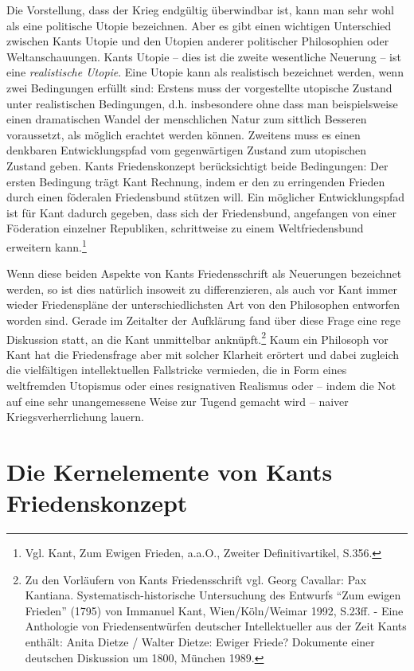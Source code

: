 \documentclass[12pt,a4paper,ngerman]{article}
\begin{document}
Die Vorstellung, dass der Krieg endgültig überwindbar ist, kann man
sehr wohl als eine politische Utopie bezeichnen. Aber es gibt einen
wichtigen Unterschied zwischen Kants Utopie und den Utopien anderer
politischer Philosophien oder Weltanschauungen. Kants Utopie -- dies
ist die zweite wesentliche Neuerung -- ist eine {\em realistische
  Utopie}. Eine Utopie kann als realistisch bezeichnet werden, wenn
zwei Bedingungen erfüllt sind: Erstens muss der vorgestellte utopische
Zustand unter realistischen Bedingungen, d.h. insbesondere ohne dass
man beispielsweise einen dramatischen Wandel der menschlichen Natur
zum sittlich Besseren voraussetzt, als möglich erachtet werden können.
Zweitens muss es einen denkbaren Entwicklungspfad vom gegenwärtigen
Zustand zum utopischen Zustand geben. Kants Friedenskonzept
berücksichtigt beide Bedingungen: Der ersten Bedingung trägt Kant
Rechnung, indem er den zu erringenden Frieden durch einen föderalen
Friedensbund stützen will. Ein möglicher Entwicklungspfad ist für Kant
dadurch gegeben, dass sich der Friedensbund, angefangen von einer
Föderation einzelner Republiken, schrittweise zu einem Weltfriedensbund
erweitern kann.\footnote{Vgl.  Kant, Zum Ewigen Frieden, a.a.O.,
  Zweiter Definitivartikel, S.356.}

Wenn diese beiden Aspekte von Kants Friedensschrift als Neuerungen
bezeichnet werden, so ist dies natürlich insoweit zu differenzieren,
als auch vor Kant immer wieder Friedenspläne der
unterschiedlichsten Art von den Philosophen entworfen worden sind.
Gerade im Zeitalter der Aufklärung fand über diese Frage eine rege
Diskussion statt, an die Kant unmittelbar anknüpft.\footnote{Zu den
  Vorläufern von Kants Friedensschrift vgl. Georg Cavallar: Pax
  Kantiana. Systematisch-historische Untersuchung des Entwurfs "`Zum
  ewigen Frieden"' (1795) von Immanuel Kant, Wien/Köln/Weimar 1992,
  S.23ff. - Eine Anthologie von Friedensentwürfen deutscher
  Intellektueller aus der Zeit Kants enthält: Anita Dietze / Walter
  Dietze: Ewiger Friede? Dokumente einer deutschen Diskussion um 1800,
  München 1989.} Kaum ein Philosoph vor Kant hat die Friedensfrage
aber mit solcher Klarheit erörtert und dabei zugleich die vielfältigen
intellektuellen Fallstricke vermieden, die in Form eines weltfremden
Utopismus oder eines resignativen Realismus oder -- indem die Not auf
eine sehr unangemessene Weise zur Tugend gemacht wird -- naiver
Kriegsverherrlichung lauern.

\section{Die Kernelemente von Kants Friedenskonzept}
\end{document}
